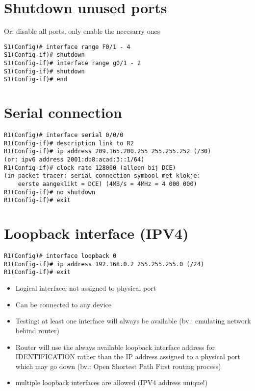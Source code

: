 \documentclass[10pt, a4paper]{article}
\begin{document}
\section{Shutdown unused ports}
Or: disable all ports, only enable the necesarry ones\\
\begin{lstlisting}
S1(Config)# interface range F0/1 - 4
S1(Config-if)# shutdown
S1(Config-if)# interface range g0/1 - 2
S1(Config-if)# shutdown
S1(Config-if)# end
\end{lstlisting}

\section{Serial connection}
\begin{lstlisting}
R1(Config)# interface serial 0/0/0
R1(Config-if)# description link to R2
R1(Config-if)# ip address 209.165.200.255 255.255.252 (/30)
(or: ipv6 address 2001:db8:acad:3::1/64)
R1(Config-if)# clock rate 128000 (alleen bij DCE)
(in packet tracer: serial connection symbool met klokje:
	eerste aangeklikt = DCE) (4MB/s = 4MHz = 4 000 000)
R1(Config-if)# no shutdown
R1(Config-if)# exit
\end{lstlisting}

\section{Loopback interface (IPV4)}
\begin{lstlisting}
R1(Config)# interface loopback 0
R1(Config-if)# ip address 192.168.0.2 255.255.255.0 (/24)
R1(Config-if)# exit
\end{lstlisting}

\begin{itemize}[noitemsep,nolistsep]
\item Logical interface, not assigned to physical port
\item Can be connected to any device
\item Testing: at least one interface will always be available (bv.: emulating network behind router)
\item Router will use the always available loopback interface address for IDENTIFICATION rather than the IP address assigned to a physical port which may go down (bv.: Open Shortest Path First routing process)
\item multiple loopback interfaces are allowed (IPV4 address unique!)\\
\end{itemize}
\end{document}
